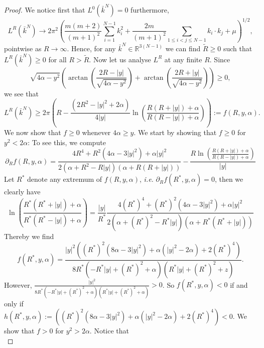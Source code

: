 \documentclass[a4paper,11pt]{article}
\newcommand{\abs}[1]{\left\lvert #1 \right\rvert}
\newcommand{\ie}{\emph{i.e.} }
\newcommand{\R}{\mathbb{R}}
\numberwithin{equation}{section}
\begin{document}
\begin{proof}
	We notice first that $ L^0(\bar{k}^N)=0 $ furthermore, \begin{equation}
	L^R(\bar{k}^N)\to2\pi^2\left(\frac{m(m+2)}{(m+1)^2}\sum_{i=1}^{N-1}k_i^2+\frac{2m}{(m+1)^2}\sum_{1\leq i<j\leq N-1}k_i\cdot k_j+\mu\right)^{1/2},
	\end{equation} pointwise as $ R\to\infty $. Hence, for any $ \bar{k}^N\in\R^{3(N-1)} $ we can find $ \tilde{R}\geq0 $ such that $ L^R(\bar{k}^N)\geq0 $ for all $ R>\tilde{R} $. Now let us analyse $ L^R $ at any finite $ R $. Since\begin{equation}
	\sqrt{4\alpha-y^2}\left(\arctan\left(\frac{2R-\abs{y}}{\sqrt{4\alpha-y^2}}\right)+\arctan\left(\frac{2R+\abs{y}}{\sqrt{4\alpha-y^2}}\right)\right)\geq0,
	\end{equation} we see that
	\begin{equation}
	L^R(\bar{k}^N)\geq2\pi\left( R-\frac{(2R^2-\abs{y}^2+2\alpha)}{4\abs{y}}\ln\left(\frac{R(R+\abs{y})+\alpha}{R(R-\abs{y})+\alpha}\right)\right):=f(R,y,\alpha).
	\end{equation}
	We now show that $ f\geq0 $ whenever $ 4\alpha\geq y $. We start by showing that $ f\geq0 $ for $ y^2<2\alpha $: To see this, we compute \begin{equation}
	\partial_R f(R,y,\alpha)=\frac{4 R^4+R^2 \left(4 \alpha -3 \abs{y}^2\right)+\alpha  \abs{y}^2}{2 \left(\alpha +R^2-R \abs{y}\right) (\alpha +R (R+\abs{y}))}-\frac{R \ln\left(\frac{R(R+\abs{y})+\alpha}{R(R-\abs{y})+\alpha}\right)}{\abs{y}}
	\end{equation}
	Let $ R^* $ denote any extremum of $ f(R,y,\alpha) $, \ie $ \partial_R f(R^*,y,\alpha)=0 $, then we clearly have \begin{equation}
	\ln\left(\frac{R^*(R^*+\abs{y})+\alpha}{R^*(R^*-\abs{y})+\alpha}\right)=\frac{\abs{y}}{R^*}\frac{4 (R^*)^{4}+(R^*)^{2} \left(4 \alpha -3 \abs{y}^2\right)+\alpha  \abs{y}^2}{2 \left(\alpha +(R^*)^{2}-R^* \abs{y}\right) (\alpha +R^* (R^*+\abs{y}))}
	\end{equation}
	Thereby we find \begin{equation}
	f(R^*,y,\alpha)=\frac{\left| y\right| ^2 \left((R^*)^2 \left(8 \alpha-3 \left| y\right| ^2\right)+\alpha \left(\left| y\right| ^2-2 \alpha\right)+2 (R^*)^4\right)}{8 R^* \left(-R^* \left| y\right| +(R^*)^2+\alpha\right) \left(R^* \left| y\right| +(R^*)^2+z\right)}.
	\end{equation}
	However, $ \frac{\left| y\right| ^2}{8 R^* \left(-R^* \left| y\right| +(R^*)^2+\alpha\right) \left(R^* \left| y\right| +(R^*)^2+\alpha\right)}>0 $. So $ f(R^*,y,\alpha)<0 $ if and only if\\ $ h(R^*,y,\alpha):=\left((R^*)^2 \left(8 \alpha-3 \left| y\right| ^2\right)+\alpha \left(\left| y\right| ^2-2 \alpha\right)+2 (R^*)^4\right)<0 $. We show that $ f>0 $ for $ y^2>2\alpha $. Notice that \begin{equation}

\end{equation}
\end{proof}
\end{document}
